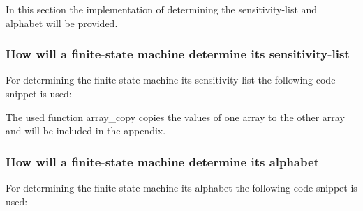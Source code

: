 In this section the implementation of determining the sensitivity-list
and alphabet will be provided.

\hypertarget{how-will-a-finite-state-machine-determine-its-sensitivity-list}{%
\subsubsection{How will a finite-state machine determine its
sensitivity-list}\label{how-will-a-finite-state-machine-determine-its-sensitivity-list}}

For determining the finite-state machine its sensitivity-list the
following code snippet is used:

\begin{Shaded}
\begin{Highlighting}[]
\NormalTok{\{}
\NormalTok{\}}
\end{Highlighting}
\end{Shaded}

The used function array\_copy copies the values of one array to the
other array and will be included in the appendix.

\hypertarget{how-will-a-finite-state-machine-determine-its-alphabet}{%
\subsubsection{How will a finite-state machine determine its
alphabet}\label{how-will-a-finite-state-machine-determine-its-alphabet}}

For determining the finite-state machine its alphabet the following code
snippet is used:

\begin{Shaded}
\begin{Highlighting}[]
\NormalTok{\{}
    \NormalTok{;}

\NormalTok{    \{}
\NormalTok{        \{}
\NormalTok{            \{}
\NormalTok{            \}}
\NormalTok{        \}}
\NormalTok{    \}}
\NormalTok{\}}
\end{Highlighting}
\end{Shaded}


